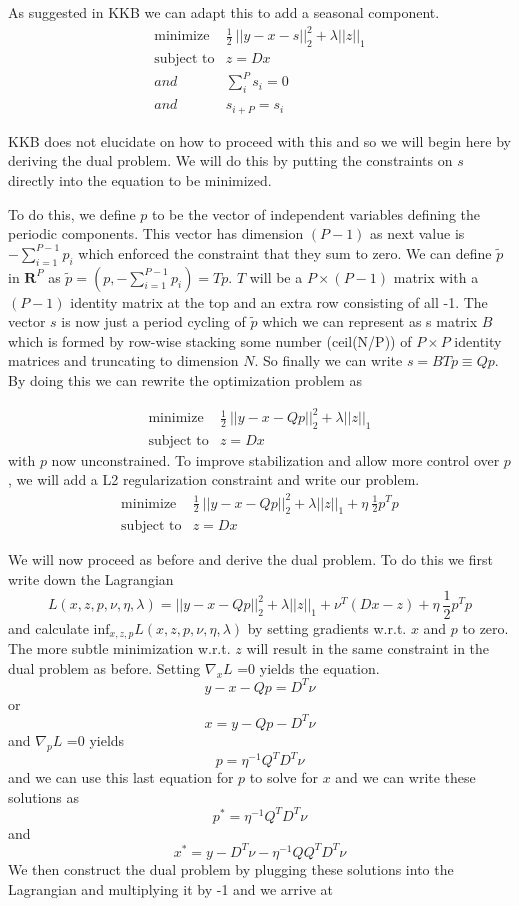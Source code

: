 \documentclass{article}
\begin{document}
As suggested in KKB we can adapt this to add a seasonal component.
\begin{eqnarray}
\mbox{minimize} & \frac{1}{2} ~ || y - x -s||_2^2  + \lambda ||z||_1 \\
\mbox{subject to} & z = D x \\
and & \sum_i^P s_i = 0\\
and & s_{i+P} = s_i
\end{eqnarray}

KKB does not elucidate on how to proceed with this and so we will begin here by deriving
the dual problem. We will do this by putting the constraints on $s$ directly into the
equation to be minimized.

To do this, we define $p$ to be the vector of independent variables defining the periodic components.
This vector has dimension $(P-1)$ as next value is $-\sum_{i=1}^{P-1} p_i$ which enforced the constraint that
they sum to zero. We can define $\tilde{p}$ in $\mathbf{R}^{P}$ as $\tilde{p} = \left( p,-\sum_{i=1}^{P-1} p_i \right) = T p$.
$T$ will be a $P \times (P-1)$ matrix with a $(P-1)$ identity matrix at the top and an extra row consisting of all -1.
The vector $s$ is now just a period cycling of $\tilde{p}$ which we can represent as s matrix $B$ which is formed by
row-wise stacking some number (ceil(N/P)) of $P \times P$ identity matrices and truncating to dimension $N$. So finally
we can write $s = B T p \equiv Q p$. By doing this we can rewrite the optimization problem as

\begin{eqnarray}
\mbox{minimize} & \frac{1}{2} ~ || y - x - Q p||_2^2  + \lambda ||z||_1 \\
\mbox{subject to} & z = D x
\end{eqnarray}
with $p$ now unconstrained. To improve stabilization and allow more control over $p$, we will add
a L2 regularization constraint and write our problem.
\begin{eqnarray}
\mbox{minimize} & \frac{1}{2} ~ || y - x - Q p||_2^2  + \lambda ||z||_1 + \eta ~ \frac{1}{2} p^Tp\\
\mbox{subject to} & z = D x
\end{eqnarray}

We will now proceed as before and derive the dual problem. To do this we first
write down the Lagrangian
\[
L(x,z,p,\nu,\eta,\lambda) =  || y - x - Q p||_2^2  + \lambda ||z||_1 + \nu^T (D x -z) + \eta ~ \frac{1}{2} p^Tp
\]
and calculate $\mbox{inf}_{x,z,p} L(x,z,p,\nu,\eta,\lambda)$ by setting gradients w.r.t. $x$ and $p$ to zero. The
more subtle minimization w.r.t. $z$ will result in the same constraint in the dual problem as before. Setting
$\nabla_x L$ =0 yields the equation.
\[
y - x - Qp = D^T \nu
\] or
\[
x = y - Qp - D^T \nu
\]
and $\nabla_p L$ =0 yields
\[
p = \eta^{-1} Q^T D^T \nu
\]
and we can use this last equation for $p$ to solve for $x$ and we can write these solutions as
\[
p^* = \eta^{-1} Q^T D^T \nu
\]
and
\[
x^* = y - D^T \nu - \eta^{-1} Q Q^T D^T \nu
\]
We then construct the dual problem by plugging these solutions into the Lagrangian and multiplying it by -1 and we
arrive at
\end{document}
